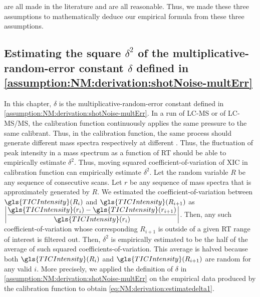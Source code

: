 		are all made in the literature and are all reasonable.
Thus, we made these three assumptions to mathematically deduce our empirical formula from these three assumptions.		
		
\subsection[Estimating the square of the multiplicative-random-error constant]
	         {Estimating the square \(\delta^2\) of the multiplicative-random-error constant \(\delta\) defined in \cref{assumption:NM:derivation:shotNoise-multErr}}
\label{subsec:error:derivation:estimate-error-constant}		
		
In this chapter, \(\delta\) is the multiplicative-random-error constant defined in \cref{assumption:NM:derivation:shotNoise-multErr}.
In a run of \gls{LC-MS} or of \gls{LC-MS/MS}, the calibration function continuously applies the same pressure to the same calibrant.  
Thus, in the calibration function, the same process should generate different mass spectra respectively at different .
Thus, the fluctuation of peak intensity in a mass spectrum as a function of \gls{RT} should be able to empirically estimate \(\delta^2\).
Thus, moving squared coefficient-of-variation of \gls{XIC} in calibration function can empirically estimate \(\delta^2\).
Let the random variable \(R\) be any sequence of consecutive scans.
Let \(r\) be any sequence of mass spectra that is approximately generated by \(R\).
We estimated the coefficient-of-variation between \(\gls{TICIntensity}(R_i)\) and \(\gls{TICIntensity}(R_{i+1})\) as 
		\(\displaystyle\left\lvert\frac{\gls{TICIntensity}(r_i) - \gls{TICIntensity}(r_{i+1})}{\gls{TICIntensity}(r_i)}\right\rvert\).
Then, any such coefficient-of-variation whose corresponding \(R_{i+1}\) is outside of a given \gls{RT} range of interest is filtered out.
Then, \(\delta^2\) is empirically estimated to be the half of the average of such squared coefficients-of-variation.
This average is halved because both \(\gls{TICIntensity}(R_i)\) and \(\gls{TICIntensity}(R_{i+1})\) are random for any valid \(i\).
More precisely, we applied the definition of \(\delta\) in \cref{assumption:NM:derivation:shotNoise-multErr} on the empirical data produced by the calibration function to obtain \cref{eq:NM:derivation:estimatedelta1}.
